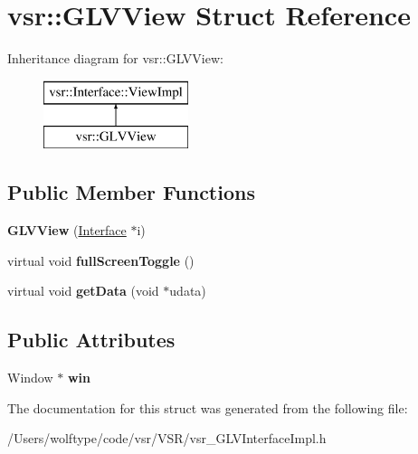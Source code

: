 \hypertarget{structvsr_1_1_g_l_v_view}{\section{vsr\-:\-:G\-L\-V\-View Struct Reference}
\label{structvsr_1_1_g_l_v_view}
}
Inheritance diagram for vsr\-:\-:G\-L\-V\-View\-:\begin{figure}[H]
\begin{center}
\leavevmode
\includegraphics[height=2.000000cm]{structvsr_1_1_g_l_v_view}
\end{center}
\end{figure}
\subsection*{Public Member Functions}
\begin{DoxyCompactItemize}
\item 
\hypertarget{structvsr_1_1_g_l_v_view_a6ba5e73dfe21ade8e88e6abe6dfee70e}{{\bfseries G\-L\-V\-View} (\hyperlink{classvsr_1_1_interface}{Interface} $\ast$i)}\label{structvsr_1_1_g_l_v_view_a6ba5e73dfe21ade8e88e6abe6dfee70e}

\item 
\hypertarget{structvsr_1_1_g_l_v_view_a018a261e8066306259005272e7f9c1e1}{virtual void {\bfseries full\-Screen\-Toggle} ()}\label{structvsr_1_1_g_l_v_view_a018a261e8066306259005272e7f9c1e1}

\item 
\hypertarget{structvsr_1_1_g_l_v_view_ad37bfb7c43bca1ee16fd4391c87f8894}{virtual void {\bfseries get\-Data} (void $\ast$udata)}\label{structvsr_1_1_g_l_v_view_ad37bfb7c43bca1ee16fd4391c87f8894}

\end{DoxyCompactItemize}
\subsection*{Public Attributes}
\begin{DoxyCompactItemize}
\item 
\hypertarget{structvsr_1_1_g_l_v_view_aac3f89f440a712331695327d71e3136d}{Window $\ast$ {\bfseries win}}\label{structvsr_1_1_g_l_v_view_aac3f89f440a712331695327d71e3136d}

\end{DoxyCompactItemize}


The documentation for this struct was generated from the following file\-:\begin{DoxyCompactItemize}
\item 
/\-Users/wolftype/code/vsr/\-V\-S\-R/vsr\-\_\-\-G\-L\-V\-Interface\-Impl.\-h\end{DoxyCompactItemize}
